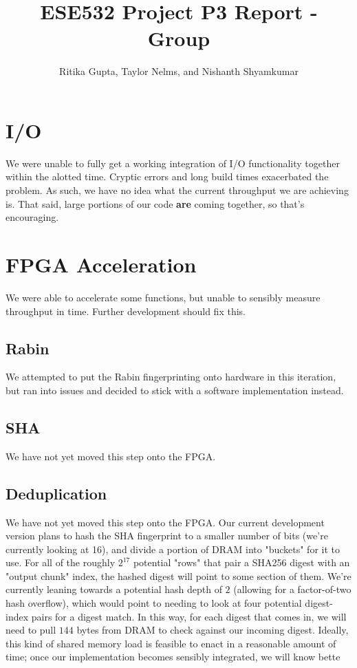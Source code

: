 \documentclass{article}
\title{ESE532 Project P3 Report - Group}
\author{Ritika Gupta, Taylor Nelms, and Nishanth Shyamkumar}
\begin{document}
\maketitle


\section{I/O}

We were unable to fully get a working integration of I/O functionality together within the alotted time. Cryptic errors and long build times exacerbated the problem. As such, we have no idea what the current throughput we are achieving is. That said, large portions of our code \textbf{are} coming together, so that's encouraging.

\section{FPGA Acceleration}

We were able to accelerate some functions, but unable to sensibly measure throughput in time. Further development should fix this.

\subsection{Rabin}

We attempted to put the Rabin fingerprinting onto hardware in this iteration, but ran into issues and decided to stick with a software implementation instead.

\subsection{SHA}

We have not yet moved this step onto the FPGA.

\subsection{Deduplication}

We have not yet moved this step onto the FPGA. Our current development version plans to hash the SHA fingerprint to a smaller number of bits (we're currently looking at 16), and divide a portion of DRAM into "buckets" for it to use. For all of the roughly $2^{17}$ potential "rows" that pair a SHA256 digest with an "output chunk" index, the hashed digest will point to some section of them. We're currently leaning towards a potential hash depth of $2$ (allowing for a factor-of-two hash overflow), which would point to needing to look at four potential digest-index pairs for a digest match.
\newline\newline
In this way, for each digest that comes in, we will need to pull $144$ bytes from DRAM to check against our incoming digest. Ideally, this kind of shared memory load is feasible to enact in a reasonable amount of time; once our implementation becomes sensibly integrated, we will know bette
\end{document}
